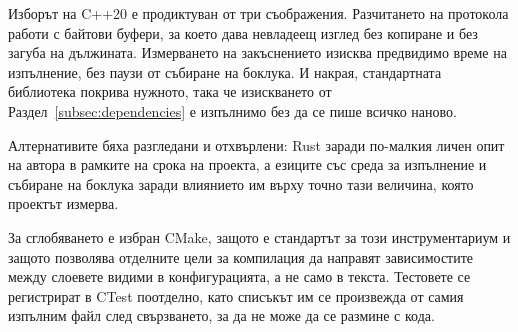 Изборът на C++20 е продиктуван от три съображения. Разчитането на протокола работи с
байтови буфери, за което  дава невладеещ изглед без копиране и без загуба
на дължината. Измерването на закъснението изисква предвидимо време на изпълнение, без паузи
от събиране на боклука. И накрая, стандартната библиотека покрива нужното, така че
изискването от Раздел~\ref{subsec:dependencies} е изпълнимо без да се пише всичко наново.

Алтернативите бяха разгледани и отхвърлени: Rust заради по-малкия личен опит на автора в
рамките на срока на проекта, а езиците със среда за изпълнение и събиране на боклука заради
влиянието им върху точно тази величина, която проектът измерва.

За сглобяването е избран CMake, защото е стандартът за този инструментариум и защото
позволява отделните цели за компилация да направят зависимостите между слоевете видими в
конфигурацията, а не само в текста. Тестовете се регистрират в CTest поотделно, като
списъкът им се произвежда от самия изпълним файл след свързването, за да не може да се
размине с кода.
